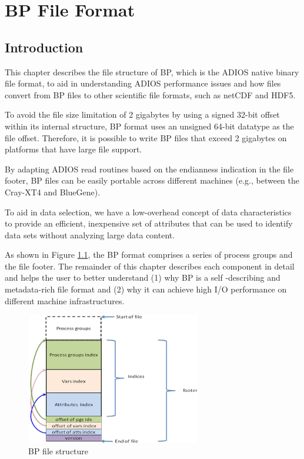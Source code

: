 \chapter{BP File Format}

\section{Introduction}

This chapter describes the file structure of BP, which is the ADIOS native binary 
file format, to aid in understanding ADIOS performance issues and how files convert 
from BP files to other scientific file formats, such as netCDF and HDF5.

To avoid the file size limitation of 2 gigabytes by using a signed 32-bit offset 
within its internal structure, BP format uses an unsigned 64-bit datatype as the 
file offset. Therefore, it is possible to write BP files that exceed 2 gigabytes 
on platforms that have large file support. 

By adapting ADIOS read routines based on the endianness indication in the file 
footer, BP files can be easily portable across different machines (e.g., between 
the Cray-XT4 and BlueGene). 

To aid in data selection, we have a low-overhead concept of data characteristics 
to provide an efficient, inexpensive set of attributes that can be used to identify 
data sets without analyzing large data content.

As shown in Figure \ref{fig:bp-file-struct}, 
the BP format comprises a series of process groups and the 
file footer. The remainder of this chapter describes each component in detail and 
helps the user to better understand (1) why BP is a self -describing and metadata-rich 
file format and (2) why it can achieve high I/O performance on different machine 
infrastructures. 

\begin{figure}[htbp]
\begin{center}
\includegraphics[width=217pt, height=163pt]{figures/bp-file-structure.png}
\caption{BP file structure}
\label{fig:bp-file-struct}
\end{center}
\end{figure}

